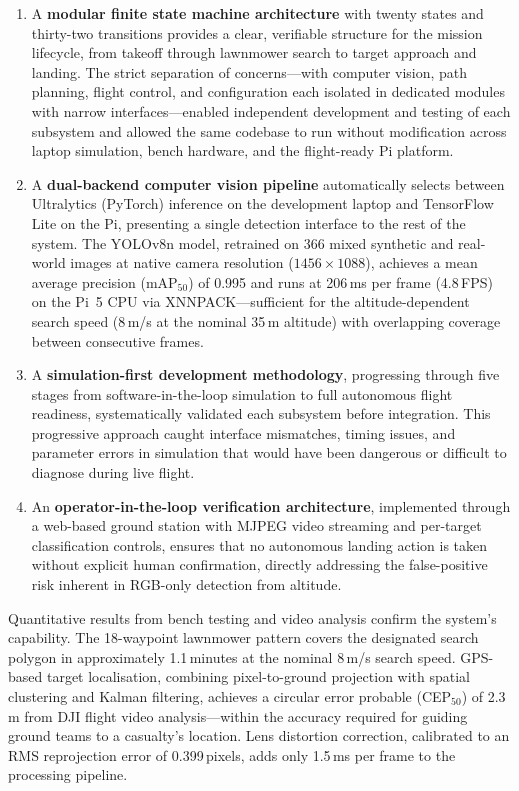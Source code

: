 \begin{enumerate}
    \item A \textbf{modular finite state machine architecture} with twenty states and thirty-two transitions provides a clear, verifiable structure for the mission lifecycle, from takeoff through lawnmower search to target approach and landing. The strict separation of concerns---with computer vision, path planning, flight control, and configuration each isolated in dedicated modules with narrow interfaces---enabled independent development and testing of each subsystem and allowed the same codebase to run without modification across laptop simulation, bench hardware, and the flight-ready Pi platform.

    \item A \textbf{dual-backend computer vision pipeline} automatically selects between Ultralytics (PyTorch) inference on the development laptop and TensorFlow Lite on the Pi, presenting a single detection interface to the rest of the system. The YOLOv8n model, retrained on 366 mixed synthetic and real-world images at native camera resolution ($1456 \times 1088$), achieves a mean average precision ($\text{mAP}_{50}$) of 0.995 and runs at 206\,ms per frame (4.8\,FPS) on the Pi~5 CPU via XNNPACK---sufficient for the altitude-dependent search speed (8\,m/s at the nominal 35\,m altitude) with overlapping coverage between consecutive frames.

    \item A \textbf{simulation-first development methodology}, progressing through five stages from software-in-the-loop simulation to full autonomous flight readiness, systematically validated each subsystem before integration. This progressive approach caught interface mismatches, timing issues, and parameter errors in simulation that would have been dangerous or difficult to diagnose during live flight.

    \item An \textbf{operator-in-the-loop verification architecture}, implemented through a web-based ground station with MJPEG video streaming and per-target classification controls, ensures that no autonomous landing action is taken without explicit human confirmation, directly addressing the false-positive risk inherent in RGB-only detection from altitude.
\end{enumerate}

Quantitative results from bench testing and video analysis confirm the system's capability. The 18-waypoint lawnmower pattern covers the designated search polygon in approximately 1.1\,minutes at the nominal 8\,m/s search speed. GPS-based target localisation, combining pixel-to-ground projection with spatial clustering and Kalman filtering, achieves a circular error probable (CEP$_{50}$) of 2.3\,m from DJI flight video analysis---within the accuracy required for guiding ground teams to a casualty's location. Lens distortion correction, calibrated to an RMS reprojection error of 0.399\,pixels, adds only 1.5\,ms per frame to the processing pipeline.

